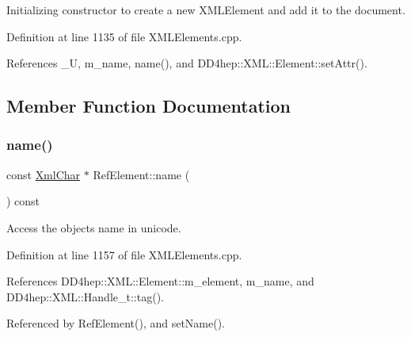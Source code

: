 Initializing constructor to create a new X\+M\+L\+Element and add it to the document. 



Definition at line 1135 of file X\+M\+L\+Elements.\+cpp.



References \+\_\+U, m\+\_\+name, name(), and D\+D4hep\+::\+X\+M\+L\+::\+Element\+::set\+Attr().



\subsection{Member Function Documentation}
\hypertarget{class_d_d4hep_1_1_x_m_l_1_1_ref_element_ace0e349adbfe709358d16fe2e5b1ecac}{}\label{class_d_d4hep_1_1_x_m_l_1_1_ref_element_ace0e349adbfe709358d16fe2e5b1ecac} 
\subsubsection{\texorpdfstring{name()}{name()}}
{\footnotesize\ttfamily const \hyperlink{namespace_d_d4hep_1_1_x_m_l_a09e5d9cc86ed782f6826dfe0778c1815}{Xml\+Char} $\ast$ Ref\+Element\+::name (\begin{DoxyParamCaption}{ }\end{DoxyParamCaption}) const}



Access the object\textquotesingle{}s name in unicode. 



Definition at line 1157 of file X\+M\+L\+Elements.\+cpp.



References D\+D4hep\+::\+X\+M\+L\+::\+Element\+::m\+\_\+element, m\+\_\+name, and D\+D4hep\+::\+X\+M\+L\+::\+Handle\+\_\+t\+::tag().



Referenced by Ref\+Element(), and set\+Name().

\hypertarget{class_d_d4hep_1_1_x_m_l_1_1_ref_element_a5af29e6f73c8b0e1aa23dff6dbe8b39d}{}\label{class_d_d4hep_1_1_x_m_l_1_1_ref_element_a5af29e6f73c8b0e1aa23dff6dbe8b39d} 
